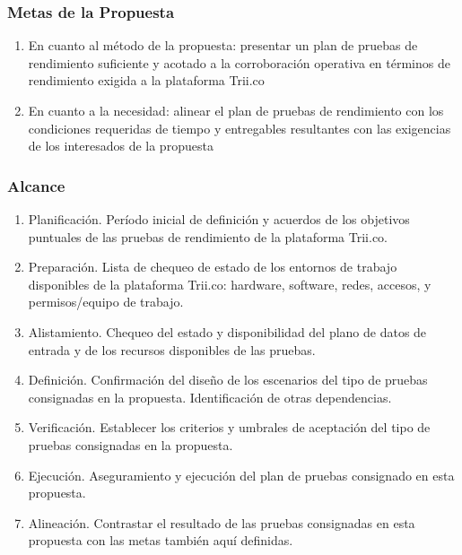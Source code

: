 \documentclass[
  paper=a4,
  ,captions=tableheading
]{scrartcl}
\providecommand{\tightlist}{%
  \setlength{\itemsep}{0pt}\setlength{\parskip}{0pt}}
\begin{document}
\subsubsection{Metas de la Propuesta}\label{sec:metas-de-la-propuesta}

\begin{enumerate}
\def\labelenumi{\arabic{enumi}.}
\tightlist
\item
  En cuanto al método de la propuesta: presentar un plan de pruebas de
  rendimiento suficiente y acotado a la corroboración operativa en
  términos de rendimiento exigida a la plataforma Trii.co
\item
  En cuanto a la necesidad: alinear el plan de pruebas de rendimiento
  con los condiciones requeridas de tiempo y entregables resultantes con
  las exigencias de los interesados de la propuesta
\end{enumerate}

\subsubsection{Alcance}\label{sec:alcance}

\begin{enumerate}
\def\labelenumi{\arabic{enumi}.}
\tightlist
\item
  Planificación. Período inicial de definición y acuerdos de los
  objetivos puntuales de las pruebas de rendimiento de la plataforma
  Trii.co.
\item
  Preparación. Lista de chequeo de estado de los entornos de trabajo
  disponibles de la plataforma Trii.co: hardware, software, redes,
  accesos, y permisos/equipo de trabajo.
\item
  Alistamiento. Chequeo del estado y disponibilidad del plano de datos
  de entrada y de los recursos disponibles de las pruebas.
\item
  Definición. Confirmación del diseño de los escenarios del tipo de
  pruebas consignadas en la propuesta. Identificación de otras
  dependencias.
\item
  Verificación. Establecer los criterios y umbrales de aceptación del
  tipo de pruebas consignadas en la propuesta.
\item
  Ejecución. Aseguramiento y ejecución del plan de pruebas consignado en
  esta propuesta.
\item
  Alineación. Contrastar el resultado de las pruebas consignadas en esta
  propuesta con las metas también aquí definidas.
\end{enumerate}
\end{document}
